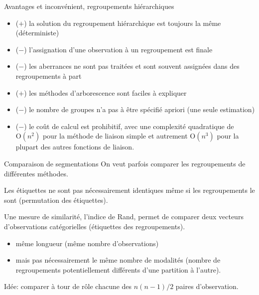 \documentclass[
  ignorenonframetext,
]{beamer}
\providecommand{\tightlist}{%
  \setlength{\itemsep}{0pt}\setlength{\parskip}{0pt}}\usepackage{longtable,booktabs,array}
\begin{document}
\begin{frame}{Avantages et inconvénient, regroupements hiérarchiques}
\protect\hypertarget{avantages-et-inconvuxe9nient-regroupements-hiuxe9rarchiques}{}
\begin{itemize}
\tightlist
\item
  (\(+\)) la solution du regroupement hiérarchique est toujours la même
  (déterministe)
\item
  (\(-\)) l'assignation d'une observation à un regroupement est finale
\item
  (\(-\)) les aberrances ne sont pas traitées et sont souvent assignées
  dans des regroupements à part
\item
  (\(+\)) les méthodes d'arborescence sont faciles à expliquer
\item
  (\(-\)) le nombre de groupes n'a pas à être spécifié apriori (une
  seule estimation)
\item
  (\(-\)) le coût de calcul est prohibitif, avec une complexité
  quadratique de \(\mathrm{O}(n^2)\) pour la méthode de liaison simple
  et autrement \(\mathrm{O}(n^3)\) pour la plupart des autres fonctions
  de liaison.
\end{itemize}
\end{frame}

\begin{frame}{Comparaison de segmentations}
\protect\hypertarget{comparaison-de-segmentations}{}
On veut parfois comparer les regroupements de différentes méthodes.

Les étiquettes ne sont pas nécessairement identiques même si les
regroupements le sont (permutation des étiquettes).

Une mesure de similarité, l'indice de Rand, permet de comparer deux
vecteurs d'observations catégorielles (étiquettes des regroupements).

\begin{itemize}
\tightlist
\item
  même longueur (même nombre d'observations)
\item
  mais pas nécessairement le même nombre de modalités (nombre de
  regroupements potentiellement différents d'une partition à l'autre).
\end{itemize}

Idée: comparer à tour de rôle chacune des \(n(n-1)/2\) paires
d'observation.
\end{frame}
\end{document}
